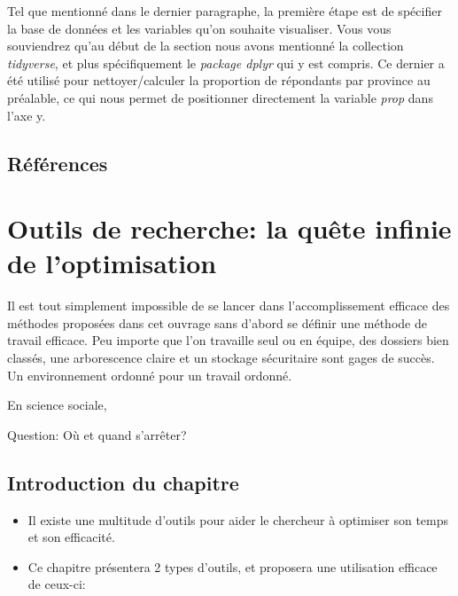 \documentclass[
  letterpaper,
]{scrbook}
\begin{document}
Tel que mentionné dans le dernier paragraphe, la première étape est de
spécifier la base de données et les variables qu'on souhaite visualiser.
Vous vous souviendrez qu'au début de la section nous avons mentionné la
collection \emph{tidyverse}, et plus spécifiquement le \emph{package
dplyr} qui y est compris. Ce dernier a été utilisé pour
nettoyer/calculer la proportion de répondants par province au préalable,
ce qui nous permet de positionner directement la variable \emph{prop}
dans l'axe y.

\clearpage

\hypertarget{ruxe9fuxe9rences-1}{%
\section{Références}\label{ruxe9fuxe9rences-1}}


\hypertarget{outils-de-recherche-la-quuxeate-infinie-de-loptimisation}{%
\chapter{Outils de recherche: la quête infinie de
l'optimisation}\label{outils-de-recherche-la-quuxeate-infinie-de-loptimisation}}

Il est tout simplement impossible de se lancer dans l'accomplissement
efficace des méthodes proposées dans cet ouvrage sans d'abord se définir
une méthode de travail efficace. Peu importe que l'on travaille seul ou
en équipe, des dossiers bien classés, une arborescence claire et un
stockage sécuritaire sont gages de succès. Un environnement ordonné pour
un travail ordonné.

En science sociale,

Question: Où et quand s'arrêter?

\hypertarget{introduction-du-chapitre}{%
\section{Introduction du chapitre}\label{introduction-du-chapitre}}

\begin{itemize}
\item
  Il existe une multitude d'outils pour aider le chercheur à optimiser
  son temps et son efficacité.
\item
  Ce chapitre présentera 2 types d'outils, et proposera une utilisation
  efficace de ceux-ci:
\end{itemize}
\end{document}
